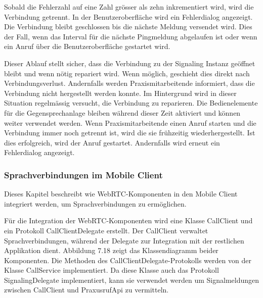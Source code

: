 Sobald die Fehlerzahl auf eine Zahl grösser als zehn inkrementiert wird, wird die Verbindung getrennt.
In der Benutzeroberfläche wird ein Fehlerdialog angezeigt.
Die Verbindung bleibt geschlossen bis die nächste Meldung versendet wird.
Dies der Fall, wenn das Interval für die nächste Pingmeldung abgelaufen ist oder wenn ein Anruf über die Benutzeroberfläche gestartet wird.

Dieser Ablauf stellt sicher, dass die Verbindung zu der Signaling Instanz geöffnet bleibt und wenn nötig repariert wird.
Wenn möglich, geschieht dies direkt nach Verbindungsverlust.
Andernfalls werden Praxismitarbeitende informiert, dass die Verbindung nicht hergestellt werden konnte.
Im Hintergrund wird in dieser Situation regelmässig versucht, die Verbindung zu reparieren.
Die Bedienelemente für die Gegensprechanlage bleiben während dieser Zeit aktiviert und können weiter verwendet werden.
Wenn Praxismitarbeitende einen Anruf starten und die Verbindung immer noch getrennt ist, wird die sie frühzeitig wiederhergestellt.
Ist dies erfolgreich, wird der Anruf gestartet.
Andernfalls wird erneut ein Fehlerdialog angezeigt.

\subsubsection{Sprachverbindungen im Mobile Client}

Dieses Kapitel beschreibt wie WebRTC-Komponenten in den Mobile Client integriert werden, um Sprachverbindungen zu ermöglichen.

Für die Integration der WebRTC-Komponenten wird eine Klasse CallClient und ein Protokoll CallClientDelegate erstellt.
Der CallClient verwaltet Sprachverbindungen, während der Delegate zur Integration mit der restlichen Applikation dient.
Abbildung 7.18 zeigt das Klassendiagramm beider Komponenten.
Die Methoden des CallClientDelegate-Protokolls werden von der Klasse CallService implementiert.
Da diese Klasse auch das Protokoll SignalingDelegate implementiert, kann sie verwendet werden um Signalmeldungen zwischen CallClient und PraxusrufApi zu vermitteln.

